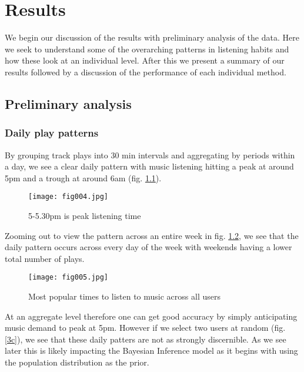 
\chapter{Results}

\label{Chapter4}

We begin our discussion of the results with preliminary analysis of the data. Here we seek to understand some of the overarching patterns in listening habits and how these look at an individual level. After this we present a summary of our results followed by a discussion of the performance of each individual method.

\section{Preliminary analysis}

\subsection{Daily play patterns}

By grouping track plays into 30 min intervals and aggregating by periods within a day, we see a clear daily pattern with music listening hitting a peak at around 5pm and a trough at around 6am (fig. \ref{3a}).

\begin{figure}[h!]
	\centering
	\texttt{[image: fig004.jpg]}
	\caption{5-5.30pm is peak listening time}
	\label{3a}
\end{figure} 

Zooming out to view the pattern across an entire week in fig. \ref{3b}, we see that the daily pattern occurs across every day of the week with weekends having a lower total number of plays.

\begin{figure}[h!]
	\centering
	\texttt{[image: fig005.jpg]}
	\caption{Most popular times to listen to music across all users}
	\label{3b}
\end{figure} 

At an aggregate level therefore one can get good accuracy by simply anticipating music demand to peak at 5pm. However if we select two users at random (fig. \ref{3c}), we see that these daily patters are not as strongly discernible. As we see later this is likely impacting the Bayesian Inference model as it begins with using the population distribution as the prior. 

